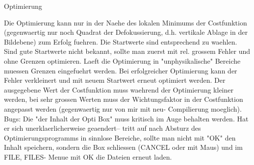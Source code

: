 Optimierung

Die Optimierung kann nur in der Naehe des lokalen Minimums der 
Costfunktion (gegenwaertig nur noch Quadrat der Defokussierung, d.h. vertikale
Ablage in der Bildebene) zum Erfolg fuehren. Die Startwerte sind entsprechend 
zu waehlen. Sind gute Startwerte nicht bekannt, sollte man zuerst mit rel.
grossem Fehler und ohne Grenzen optimieren. Laeft die Optimierung in
"unphysikalische" Bereiche muessen Grenzen eingefuehrt werden. Bei
erfolgreicher Optimierung kann der Fehler verkleinert und mit neuem Startwert
erneut optimiert werden. Der ausgegebene Wert der Costfunktion muss
waehrend der Optimierung kleiner werden, bei sehr grossen Werten muss der 
Wichtungsfaktor in der Costfunktion angepasst werden (gegenwaertig nur von mir
mit neu- Compilierung moeglich).
Bugs: Die "der Inhalt der Opti Box" muss kritisch im Auge behalten werden. Hat
er sich unerklaerlicherweise geaendert-- tritt auf nach Absturz des
Optimierungsprogramms in sinnlose Bereiche, sollte man nicht mit "OK" den
Inhalt speichern, sondern die Box schliessen (CANCEL oder mit Maus) und im
FILE, FILES- Menue mit OK die Dateien erneut laden.
